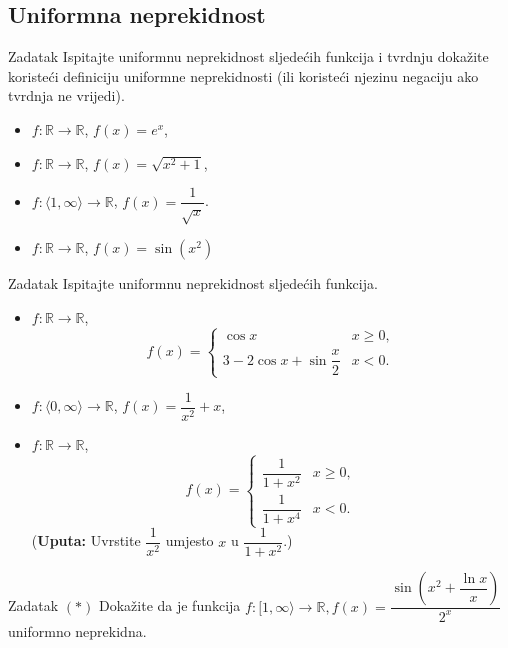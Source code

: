 \subsection*{Uniformna neprekidnost}
\begin{exercise}{Zadatak} Ispitajte uniformnu neprekidnost sljedećih funkcija i tvrdnju dokažite koristeći definiciju uniformne neprekidnosti (ili koristeći njezinu negaciju ako tvrdnja ne vrijedi).
\begin{itemize}
\item[a)] $f : \mathbb{R}\to \mathbb{R}$, $f(x)=e^x$,
\item[b)] $f : \mathbb{R}\to \mathbb{R}$, $f(x)=\sqrt{x^2+1}$,
\item[c)] $f : \langle 1, \infty\rangle\to \mathbb{R}$, $f(x)=\dfrac{1}{\sqrt{x}}$.
\item[d)] $f : \mathbb{R}\to \mathbb{R}$, $f(x)=\sin{\left(x^2\right)}$
\end{itemize}
\end{exercise}
\begin{exercise}{Zadatak} Ispitajte uniformnu neprekidnost sljedećih funkcija.
\begin{itemize}
\item[a)] $f : \mathbb{R}\to \mathbb{R}$,
$$f(x)=\begin{cases}
\cos{x} & x\geq 0,\\
3-2\cos{x}+\sin{\dfrac{x}{2}} & x<0.
\end{cases}$$
\item[b)] $f : \langle 0, \infty\rangle\to \mathbb{R}$, $f(x)=\dfrac{1}{x^2}+x$,
\item[c)] $f : \mathbb{R}\to \mathbb{R}$,
$$f(x)=\begin{cases}
\dfrac{1}{1+x^2} & x\geq 0,\\
\dfrac{1}{1+x^4} & x<0.
\end{cases}$$
(\textbf{Uputa:} Uvrstite $\dfrac{1}{x^2}$ umjesto $x$ u $\dfrac{1}{1+x^2}$.)
\end{itemize}
\end{exercise}
\begin{exercise}{Zadatak} $(*)$
Dokažite da je funkcija $f : [1, \infty\rangle\to \mathbb{R}, f(x)=\dfrac{\sin\left(x^{2}+\dfrac{\ln{x}}{x}\right)}{2^{x}}$ uniformno neprekidna.
\end{exercise}